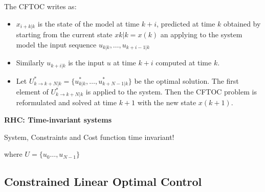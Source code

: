 \documentclass[8pt,a4paper]{scrartcl}
\begin{document}
\begin{multicols*}{3}
The CFTOC writes as:


\begin{itemize}
\ncompaq
\item $x_{i+k|k}$ is the state of the model at time $k+i$, predicted at time $k$ obtained by starting from the current state $x{k|k}=x(k)$ an applying to the system model the input sequence $u_{k|k},\ldots, u_{k+i-1|k}$
\item Similarly $u_{k+i|k}$ is the input $u$ at time $k+i$ computed at time $k$.
\item Let $U^\ast_{k\rightarrow k+N|k}=\{u_{k|k}^\ast,\ldots,u_{k+N-1|k}^\ast\}$ be the optimal solution. The first element of $U_{k\rightarrow k+N|k}^\ast$ is applied to the system. Then the CFTOC problem is reformulated and solved at time $k+1$ with the new state $x(k+1)$.
\end{itemize}



\textbf{RHC: Time-invariant systems}

System, Constraints and Cost function time invariant!


where $U=\{u_0\ldots,u_{N-1}\}$

\subsection{Constrained Linear Optimal Control}


\end{multicols*}
\end{document}
